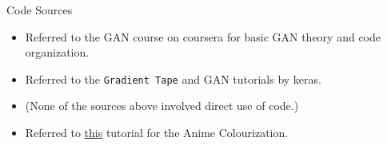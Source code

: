 \documentclass[handout]{beamer}
\begin{document}
\begin{frame}{Code Sources}
    \begin{itemize}
        \item Referred to the GAN course on coursera for basic GAN theory and code organization.  
        \item Referred to the \texttt{Gradient Tape} and GAN tutorials by keras. 
        \item (None of the sources above involved direct use of code.)
        \item Referred to \href{https://towardsdatascience.com/generative-adversarial-networks-gans-89ef35a60b69}{this} tutorial for the Anime Colourization.
    \end{itemize}
\end{frame}
\end{document}
